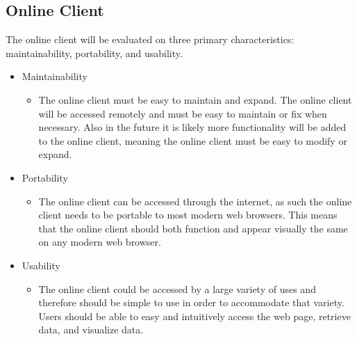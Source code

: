 \documentclass[onecolumn, draftclsnofoot,10pt, compsoc]{IEEEtran}
\begin{document}
\subsection{Online Client}
The online client will be evaluated on three primary characteristics: maintainability, portability, and usability.
\begin{itemize}
    \item Maintainability
        \begin{itemize}
            \item The online client must be easy to maintain and expand.
            The online client will be accessed remotely and must be easy to maintain or fix when necessary.
            Also in the future it is likely more functionality will be added to the online client, meaning the online client must be easy to modify or expand.
        \end{itemize}
    \item Portability
        \begin{itemize}
            \item The online client can be accessed through the internet, as such the online client needs to be portable to most modern web browsers. This means that the online client should both function and appear visually the same on any modern web browser.
        \end{itemize}
    \item Usability
        \begin{itemize}
            \item The online client could be accessed by a large variety of uses and therefore should be simple to use in order to accommodate that variety. Users should be able to easy and intuitively access the web page, retrieve data, and visualize data.
        \end{itemize}
\end{itemize}
\newpage

\end{document}
